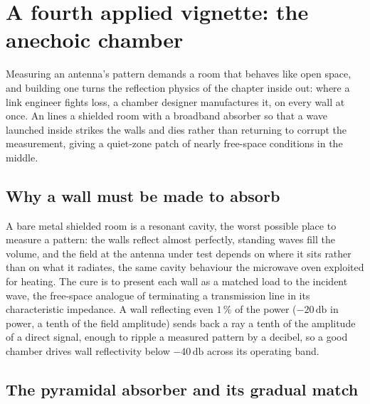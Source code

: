 \section{A fourth applied vignette: the anechoic chamber}

Measuring an antenna's pattern demands a room that behaves like open space,
and building one turns the reflection physics of the chapter inside out:
where a link engineer fights loss, a chamber designer manufactures it, on
every wall at once. An  lines a shielded room
with a broadband absorber so that a wave launched inside strikes the walls
and dies rather than returning to corrupt the measurement, giving a
quiet-zone patch of nearly free-space conditions in the middle.

\subsection{Why a wall must be made to absorb}

A bare metal shielded room is a resonant cavity, the worst possible place
to measure a pattern: the walls reflect almost perfectly, standing waves
fill the volume, and the field at the antenna under test depends on where
it sits rather than on what it radiates, the same cavity behaviour the
microwave oven exploited for heating. The cure is to present each wall as a
matched load to the incident wave, the free-space analogue of terminating
a transmission line in its characteristic impedance. A wall reflecting even
$1\,\%$ of the power ($-20\,\si{\decibel}$ in power, a tenth of the field
amplitude) sends back a ray a tenth of the amplitude of a direct signal,
enough to ripple a measured pattern by a decibel, so a good chamber drives
wall reflectivity below $-40\,\si{\decibel}$ across its operating band.

\subsection{The pyramidal absorber and its gradual match}

